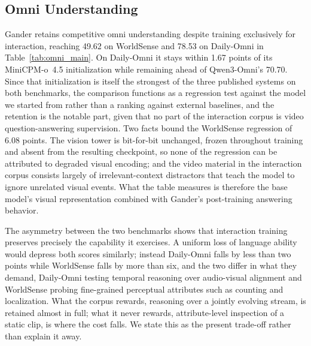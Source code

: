 \subsection{Omni Understanding}
\label{sec:result_omni}



Gander retains competitive omni understanding despite training exclusively for interaction,
reaching 49.62 on WorldSense and 78.53 on Daily-Omni in Table~\ref{tab:omni_main}. On Daily-Omni
it stays within 1.67 points of its MiniCPM-o~4.5 initialization while remaining ahead of
Qwen3-Omni's 70.70. Since that initialization is itself the strongest of the three published
systems on both benchmarks, the comparison functions as a regression test against the model we
started from rather than a ranking against external baselines, and the retention is the notable
part, given that no part of the interaction corpus is video question-answering supervision. Two
facts bound the WorldSense regression of 6.08 points. The vision tower is bit-for-bit unchanged,
frozen throughout training and absent from the resulting checkpoint, so none of the regression can
be attributed to degraded visual encoding; and the video material in the interaction corpus
consists largely of irrelevant-context distractors that teach the model to ignore unrelated visual
events. What the table measures is therefore the base model's visual representation combined with
Gander's post-training answering behavior.

The asymmetry between the two benchmarks shows that interaction training preserves precisely the
capability it exercises. A uniform loss of language ability would depress both scores similarly;
instead Daily-Omni falls by less than two points while WorldSense falls by more than six, and the
two differ in what they demand, Daily-Omni testing temporal reasoning over audio-visual alignment
and WorldSense probing fine-grained perceptual attributes such as counting and localization. What
the corpus rewards, reasoning over a jointly evolving stream, is retained almost in full; what it
never rewards, attribute-level inspection of a static clip, is where the cost falls. We state this
as the present trade-off rather than explain it away.

